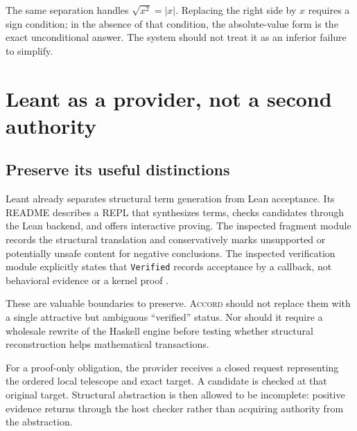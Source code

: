 \documentclass[11pt,a4paper]{article}
\newcommand{\code}[1]{\nolinkurl{#1}}
\newcommand{\Accord}{\textsc{Accord}}
\theoremstyle{definition}
\begin{document}
The same separation handles $\sqrt{x^2}=|x|$. Replacing the right side by $x$
requires a sign condition; in the absence of that condition, the absolute-value
form is the exact unconditional answer. The system should not treat it as an
inferior failure to simplify.

\section{Leant as a provider, not a second authority}
\label{sec:leant}
\subsection{Preserve its useful distinctions}
Leant already separates structural term generation from Lean acceptance. Its
README describes a REPL that synthesizes terms, checks candidates through the
Lean backend, and offers interactive proving. The inspected fragment module
records the structural translation and conservatively marks unsupported or
potentially unsafe content for negative conclusions. The inspected verification
module explicitly states that \code{Verified} records acceptance by a callback,
not behavioral evidence or a kernel proof \cite{l-readme,l-fragment,l-verification}.

These are valuable boundaries to preserve. \Accord{} should not replace them
with a single attractive but ambiguous ``verified'' status. Nor should it require
a wholesale rewrite of the Haskell engine before testing whether structural
reconstruction helps mathematical transactions.

For a proof-only obligation, the provider receives a closed request representing
the ordered local telescope and exact target. A candidate is checked at that
original target. Structural abstraction is then allowed to be incomplete:
positive evidence returns through the host checker rather than acquiring authority
from the abstraction.
\end{document}
